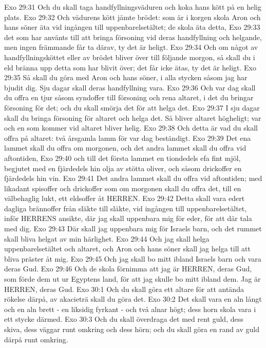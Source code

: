 Exo 29:31  Och du skall taga handfyllningsväduren och koka hans kött på en helig plats.
Exo 29:32  Och vädurens kött jämte brödet: som är i korgen skola Aron och hans söner äta vid ingången till uppenbarelsetältet; de skola äta detta,
Exo 29:33  det som har använts till att bringa försoning vid deras handfyllning och helgande, men ingen främmande får ta därav, ty det är heligt.
Exo 29:34  Och om något av handfyllningsköttet eller av brödet bliver över till följande morgon, så skall du i eld bränna upp detta som har blivit över; det får icke ätas, ty det är heligt.
Exo 29:35  Så skall du göra med Aron och hans söner, i alla stycken såsom jag har bjudit dig. Sju dagar skall deras handfyllning vara.
Exo 29:36  Och var dag skall du offra en tjur såsom syndoffer till försoning och rena altaret, i det du bringar försoning för det; och du skall smörja det för att helga det.
Exo 29:37  I sju dagar skall du bringa försoning för altaret och helga det. Så bliver altaret högheligt; var och en som kommer vid altaret bliver helig.
Exo 29:38  Och detta är vad du skall offra på altaret: två årsgamla lamm för var dag beständigt.
Exo 29:39  Det ena lammet skall du offra om morgonen, och det andra lammet skall du offra vid aftontiden,
Exo 29:40  och till det första lammet en tiondedels efa fint mjöl, begjutet med en fjärdedels hin olja av stötta oliver, och såsom drickoffer en fjärdedels hin vin.
Exo 29:41  Det andra lammet skall du offra vid aftontiden; med likadant spisoffer och drickoffer som om morgonen skall du offra det, till en välbehaglig lukt, ett eldsoffer åt HERREN.
Exo 29:42  Detta skall vara edert dagliga brännoffer från släkte till släkte, vid ingången till uppenbarelsetältet, inför HERRENS ansikte, där jag skall uppenbara mig för eder, för att där tala med dig.
Exo 29:43  Där skall jag uppenbara mig för Israels barn, och det rummet skall bliva helgat av min härlighet.
Exo 29:44  Och jag skall helga uppenbarelsetältet och altaret, och Aron och hans söner skall jag helga till att bliva präster åt mig.
Exo 29:45  Och jag skall bo mitt ibland Israels barn och vara deras Gud.
Exo 29:46  Och de skola förnimma att jag är HERREN, deras Gud, som förde dem ut ur Egyptens land, för att jag skulle bo mitt ibland dem. Jag är HERREN, deras Gud.
Exo 30:1  Och du skall göra ett altare för att antända rökelse därpå, av akacieträ skall du göra det.
Exo 30:2  Det skall vara en aln långt och en aln brett - en liksidig fyrkant - och två alnar högt; dess horn skola vara i ett stycke därmed.
Exo 30:3  Och du skall överdraga det med rent guld, dess skiva, dess väggar runt omkring och dess hörn; och du skall göra en rand av guld därpå runt omkring.
